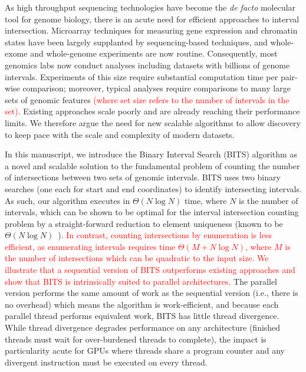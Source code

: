 \documentclass{bioinfo}
\begin{document}
As high throughput sequencing technologies have become the 
\emph{de facto} molecular tool for genome biology, there is an acute need for 
efficient approaches to interval intersection. Microarray
techniques for measuring gene expression and chromatin
states have been largely supplanted by sequencing-based techniques, 
and whole-exome and whole-genome
experiments are now routine. Consequently, most genomics labs now conduct
analyses including datasets with billions of genome intervals.
Experiments of this size require substantial computation time per pair-wise
comparison; moreover, typical analyses require comparisons to many large sets of
genomic features \textcolor{red} {(where set size refers to the number 
of intervals in the set)}. Existing approaches scale poorly and
are already reaching their performance limits. We therefore argue
the need for new scalable algorithms to allow discovery to keep pace with the
scale and complexity of modern datasets.

In this manuscript, we introduce the Binary Interval Search (BITS) algorithm as
a novel and scalable solution to the fundamental problem of counting the number
of intersections between two sets of genomic intervals.  BITS uses two binary 
searches (one each for start and end coordinates) to identify intersecting 
intervals. As such, our algorithm executes
in $\Theta(N \log N)$ time, where $N$ is the number of intervals, which can be
shown to be optimal for the interval intersection counting problem by a
straight-forward reduction to element uniqueness (known to be
$\Theta(N\log N)$~\citep{misra1982}).  \textcolor{red}{In contrast, counting 
intersections by enumeration is less efficient, as enumerating intervals 
requires time $\Theta(M + N \log N)$, where $M$ is the number of intersections 
which can be quadratic to the input size.
We illustrate that a sequential version 
of BITS outperforms existing approaches and show that BITS 
is intrinsically suited to parallel architectures.} The parallel 
version performs the same amount of work as the sequential version 
(i.e., there is no overhead) which means the algorithm is work-efficient, and 
because each parallel thread performs equivalent work, BITS has little thread 
divergence. While thread divergence degrades performance on any architecture 
(finished threads must wait for over-burdened threads to complete),
the impact is particularity acute for GPUs where threads share a program counter
and any divergent instruction must be executed on every thread.
\end{document}
